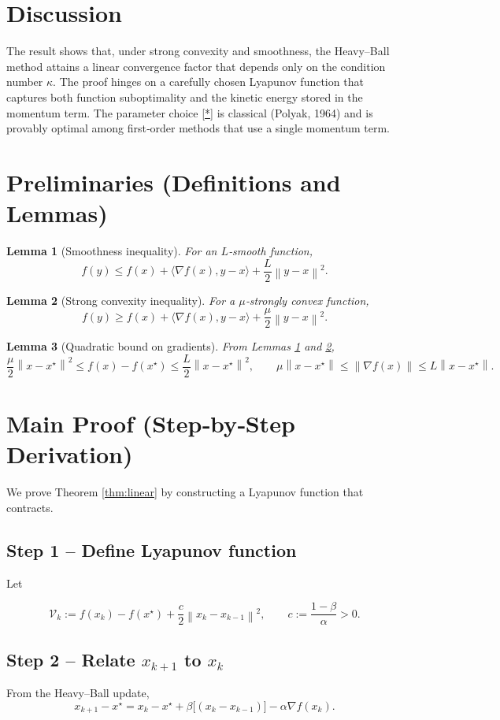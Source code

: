\documentclass{article}
\newtheorem{lemma}{Lemma}
\newcommand{\norm}[1]{\left\|#1\right\|}
\begin{document}
\section*{Discussion}
The result shows that, under strong convexity and smoothness, the Heavy–Ball method attains a linear convergence factor that depends only on the condition number $\kappa$. The proof hinges on a carefully chosen Lyapunov function that captures both function suboptimality and the kinetic energy stored in the momentum term. The parameter choice \eqref{*} is classical (Polyak, 1964) and is provably optimal among first‑order methods that use a single momentum term.

\newpage
\section*{Preliminaries (Definitions and Lemmas)}
\begin{lemma}[Smoothness inequality]\label{lem:smooth}
For an $L$‑smooth function,
\[
f(y)\le f(x)+\langle\nabla f(x),y-x\rangle+\frac{L}{2}\norm{y-x}^{2}.
\]
\end{lemma}
\begin{lemma}[Strong convexity inequality]\label{lem:strong}
For a $\mu$‑strongly convex function,
\[
f(y)\ge f(x)+\langle\nabla f(x),y-x\rangle+\frac{\mu}{2}\norm{y-x}^{2}.
\]
\end{lemma}
\begin{lemma}[Quadratic bound on gradients]\label{lem:gradbound}
From Lemmas \ref{lem:smooth} and \ref{lem:strong},
\[
\frac{\mu}{2}\norm{x-x^\star}^{2}\le f(x)-f(x^\star)\le \frac{L}{2}\norm{x-x^\star}^{2},
\qquad
\mu\norm{x-x^\star}\le \norm{\nabla f(x)}\le L\norm{x-x^\star}.
\]
\end{lemma}

\section*{Main Proof (Step‑by‑Step Derivation)}
We prove Theorem \ref{thm:linear} by constructing a Lyapunov function that contracts.  

\subsection*{Step 1 – Define Lyapunov function}
Let  

\[
\mathcal{V}_k:=f(x_k)-f(x^\star)+\frac{c}{2}\norm{x_k-x_{k-1}}^{2},
\qquad c:=\frac{1-\beta}{\alpha}>0.
\tag{1}
\]

\subsection*{Step 2 – Relate $x_{k+1}$ to $x_k$}
From the Heavy–Ball update,
\[
x_{k+1}-x^\star = x_k-x^\star+\beta\bigl[(x_k-x_{k-1})\bigr]-\alpha\nabla f(x_k).
\tag{2}
\]
\end{document}
